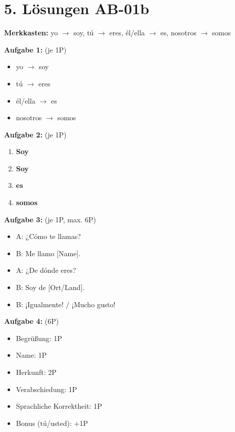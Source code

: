\documentclass[11pt, a4paper]{article}
\newcommand{\loesung}[1]{\textcolor{loesung}{\textbf{#1}}}
\begin{document}
\section*{5. Lösungen AB-01b}

\textbf{Merkkasten:}
yo $\rightarrow$ soy, tú $\rightarrow$ eres, él/ella $\rightarrow$ es, nosotros $\rightarrow$ somos

\vspace{0.5em}

\textbf{Aufgabe 1:} (je 1P)
\begin{itemize}
    \item yo $\rightarrow$ soy
    \item tú $\rightarrow$ eres
    \item él/ella $\rightarrow$ es
    \item nosotros $\rightarrow$ somos
\end{itemize}

\textbf{Aufgabe 2:} (je 1P)
\begin{enumerate}[label=\alph*)]
    \item \loesung{Soy}
    \item \loesung{Soy}
    \item \loesung{es}
    \item \loesung{somos}
\end{enumerate}

\textbf{Aufgabe 3:} (je 1P, max. 6P)
\begin{itemize}
    \item A: ¿Cómo te llamas?
    \item B: Me llamo [Name].
    \item A: ¿De dónde eres?
    \item B: Soy de [Ort/Land].
    \item B: ¡Igualmente! / ¡Mucho gusto!
\end{itemize}

\textbf{Aufgabe 4:} (6P)
\begin{itemize}
    \item Begrüßung: 1P
    \item Name: 1P
    \item Herkunft: 2P
    \item Verabschiedung: 1P
    \item Sprachliche Korrektheit: 1P
    \item Bonus (tú/usted): +1P
\end{itemize}

\end{document}
